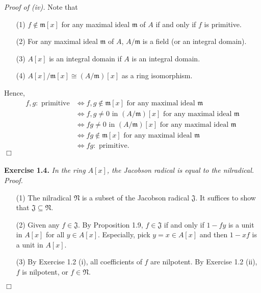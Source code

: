 \documentclass{article}
\begin{document}
\emph{Proof of (iv).}
Note that
\begin{enumerate}
\item[(1)]
$f \notin \mathfrak{m}[x]$ for any maximal ideal $\mathfrak{m}$ of $A$
if and only if $f$ is primitive.
\item[(2)]
For any maximal ideal $\mathfrak{m}$ of $A$,
$A/\mathfrak{m}$ is a field (or an integral domain).
\item[(3)]
$A[x]$ is an integral domain if $A$ is an integral domain.
\item[(4)]
$A[x]/\mathfrak{m}[x] \cong (A/\mathfrak{m})[x]$ as a ring isomorphism.
\end{enumerate}
Hence,
\begin{align*}
f, g:\text{ primitive}
&\Longleftrightarrow
f, g \notin \mathfrak{m}[x] \text{ for any maximal ideal } \mathfrak{m} \\
&\Longleftrightarrow
f, g \neq 0 \text{ in } (A/\mathfrak{m})[x] \text{ for any maximal ideal } \mathfrak{m} \\
&\Longleftrightarrow
fg \neq 0 \text{ in } (A/\mathfrak{m})[x] \text{ for any maximal ideal } \mathfrak{m} \\
&\Longleftrightarrow
fg \notin \mathfrak{m}[x] \text{ for any maximal ideal } \mathfrak{m} \\
&\Longleftrightarrow
fg:\text{ primitive}.
\end{align*}
$\Box$ \\\\






\textbf{Exercise 1.4.}
\emph{In the ring $A[x]$, the Jacobson radical is equal to the nilradical.} \\

\emph{Proof.}
\begin{enumerate}
\item[(1)]
The nilradical $\mathfrak{N}$ is a subset of the Jacobson radical $\mathfrak{J}$.
It suffices to show that $\mathfrak{J} \subseteq \mathfrak{N}$.
\item[(2)]
Given any $f \in \mathfrak{J}$. By Proposition 1.9,
$f \in \mathfrak{J}$ if and only if
$1 - fy$ is a unit in $A[x]$ for all $y \in A[x]$.
Especially, pick $y = x \in A[x]$ and then $1 - xf$ is a unit in $A[x]$.
\item[(3)]
By Exercise 1.2 (i), all coefficients of $f$ are nilpotent.
By Exercise 1.2 (ii), $f$ is nilpotent, or $f \in \mathfrak{N}$.
\end{enumerate}
$\Box$ \\\\
\end{document}
